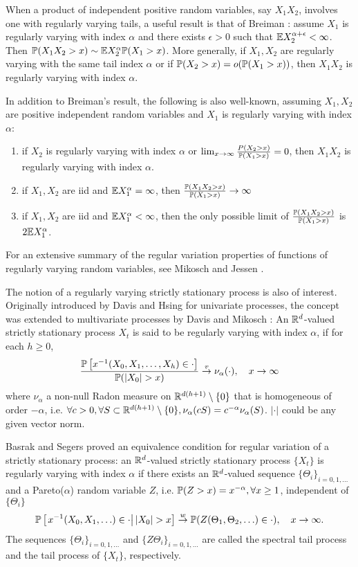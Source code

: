 When a product of independent positive random variables, say $X_1
X_2$, involves one with regularly varying tails, a useful result is
that of Breiman \cite{breiman:1965}: assume $X_1$ is regularly varying
with index $\alpha$ and there exists $\epsilon > 0$ such that
$\E X_2^{\alpha + \epsilon} < \infty$.
Then $\P(X_1 X_2 > x) \sim \E X_2^{\alpha} \P(X_1 > x)$.
More generally, if $X_1, X_2$ are regularly varying with the same tail
index $\alpha$ or if $\P(X_2 > x) = o(\P(X_1 > x))$, then $X_1 X_2$ is
regularly varying with index $\alpha$.

In addition to Breiman's result, the following is also well-known,
assuming $X_1, X_2$ are positive independent random variables and
$X_1$ is regularly varying with index $\alpha$:
\begin{enumerate}
\item if $X_2$ is regularly varying with index $\alpha$ or
  $\lim_{x \to \infty} {P(X_2 > x) \over \P(X_1 > x)} = 0$, then $X_1
  X_2$ is regularly varying with index $\alpha$.
\item if $X_1, X_2$ are iid and $\E X_1^\alpha = \infty$, then
  ${\P(X_1 X_2 > x) \over \P(X_1 > x)} \to \infty$
\item if $X_1, X_2$ are iid and $\E X_1^\alpha < \infty$, then the
  only possible limit of ${\P(X_1 X_2 > x) \over \P(X_1 > x)}$ is
  $2 \E X_1^\alpha$.
\end{enumerate}
For an extensive summary of the regular variation properties of
functions of regularly varying random variables, see Mikosch and
Jessen \cite{JessenMikosch2006}.

The notion of a regularly varying strictly stationary process is also of
interest. Originally introduced by Davis and Hsing
\cite{davis:hsing:1995} for univariate processes, the concept was
extended to multivariate processes by Davis and Mikosch
\cite{davis:mikosch:2009b}: An $\reals^d$-valued strictly stationary
process $X_t$ is said to be regularly varying with index $\alpha$, if
for each $h \geq 0$, 
\[
  {
    \P\left[x^{-1}(X_0, X_1, \dots, X_h) \in \cdot \right]
    \over
    \P(|X_0| > x)
  } \overset{v}{\to} \nu_\alpha(\cdot),
  \quad x \to \infty
\]
where $\nu_\alpha$ a non-null Radon measure on
$\reals^{d(h+1)} \setminus \{0\}$ that
is homogeneous of order $-\alpha$, i.e.
$\forall c > 0, \forall S \subset \reals^{d(h+1)}\setminus\{0\}, \nu_\alpha(c S) = c^{-\alpha} \nu_\alpha(S)$. $|\cdot|$ could be any given vector norm.

Basrak and Segers \cite{basrak:segers:2009} proved an equivalence
condition for regular variation of
a strictly stationary process: an $\reals^d$-valued strictly stationary
process $\{X_t\}$ is regularly varying with index $\alpha$ if 
there exists an $\reals^d$-valued sequence $\{\Theta_i\}_{i = 0,1,\ldots}$
and a Pareto($\alpha$) random variable $Z$, i.e.
$\P(Z > x) = x^{-\alpha}, \forall x \geq 1$, independent of
$\{\Theta_i\}$
\[
\P\left[\left.
  x^{-1}(X_0, X_1, \ldots) \in \cdot
  \right| |X_0| > x
  \right]
  \overset{w}{\to}
  \P(Z(\Theta_1, \Theta_2, \ldots) \in \cdot),
  \quad
  x \to \infty.
\]
The sequences $\{\Theta_i\}_{i = 0,1,\ldots}$ and
$\{Z \Theta_i\}_{i = 0,1,\ldots}$ are called the spectral tail process
and the tail process of $\{X_t\}$, respectively.

